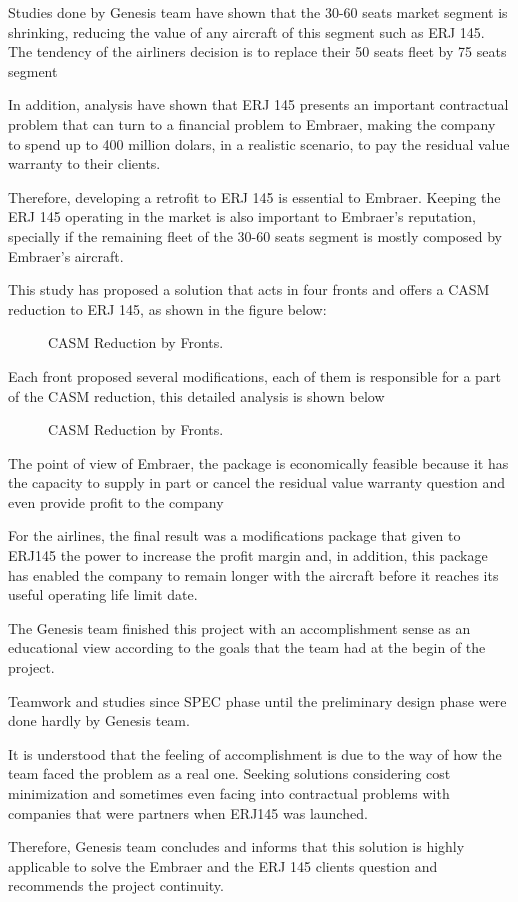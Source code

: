 Studies done by Genesis team have shown that the 30-60 seats market segment is shrinking, reducing the value of any aircraft of this segment such as ERJ 145.
The tendency of the airliners decision is to replace their 50 seats fleet by 75 seats segment

In addition, analysis have shown that ERJ 145 presents an important contractual problem that can turn to a financial problem to Embraer, making the company to spend up to 400 million dolars, in a realistic scenario, to pay the residual value warranty to their clients.

Therefore, developing a retrofit to ERJ 145 is essential to Embraer. Keeping the ERJ 145 operating in the market is also important to Embraer's reputation, specially if the remaining fleet of the 30-60 seats segment is mostly composed by Embraer's aircraft.

This study has proposed a solution that acts in four fronts and offers a CASM reduction to ERJ 145, as shown in the figure below:

\begin{figure}[H] %
\caption{CASM Reduction by Fronts.}
\label{fig:GraphCASMReductionbyFronts}
\end{figure}


Each front proposed several modifications, each of them is responsible for a part of the CASM reduction, this detailed analysis is shown below

\begin{figure}[H] %
\caption{CASM Reduction by Fronts.}
\label{fig:GraphCASMReductionDistribution}
\end{figure}


The point of view of Embraer, the package is economically feasible because it has the capacity to supply in part or cancel the residual value warranty question and even provide profit to the company

For the airlines, the final result was a modifications package that given to ERJ145 the power to increase the profit margin and, in addition, this package has enabled the company to remain longer with the aircraft before it reaches its useful operating life limit date.

The Genesis team finished this project with an accomplishment sense as an educational view according to the goals that the team had at the begin of the project.

Teamwork and studies since SPEC phase until the preliminary design phase were done hardly by Genesis team.

It is understood that the feeling of accomplishment is due to the way of how the team faced the problem as a real one. Seeking solutions considering cost minimization and sometimes even facing into contractual problems
with companies that were partners when ERJ145 was launched.

Therefore, Genesis team concludes and informs that this solution is highly applicable to solve the Embraer and the ERJ 145 clients question and recommends the project continuity.

